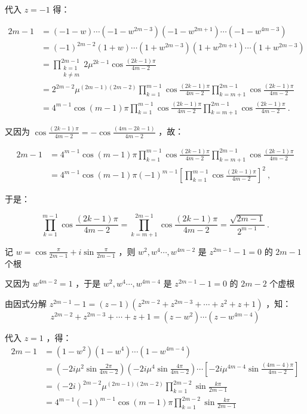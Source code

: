 代入 $z=-1$ 得：

\begin{equation}
\begin{aligned}
2m-1&=(-1-w)\cdots(-1-w^{2m-3})(-1-w^{2m+1})\cdots(-1-w^{4m-3})\\ &=(-1)^{2m-2}(1+w)\cdots(1+w^{2m-3})(1+w^{2m+1})\cdots(1+w^{2m-3})\\ &=\prod_{\substack{k=1\\k\neq m}}^{2m-1}2\mu^{2k-1}\cos\frac{(2k-1)\pi}{4m-2}\\ &=2^{2m-2}\mu^{(2m-1)(2m-2)}\prod_{k=1}^{m-1}\cos{\frac{(2k-1)\pi}{4m-2}}\prod_{k=m+1}^{2m-1}\cos{\frac{(2k-1)\pi}{4m-2}}\\ &=4^{m-1}\cos(m-1)\pi\prod_{k=1}^{m-1}\cos{\frac{(2k-1)\pi}{4m-2}}\prod_{k=m+1}^{2m-1}\cos{\frac{(2k-1)\pi}{4m-2}}~.
\end{aligned}
\end{equation}

又因为 $\displaystyle{\cos\frac{(2k-1)\pi}{4m-2}=-\cos\frac{(4m-2k-1)}{4m-2}}$ ，故：

\begin{equation}
\begin{aligned}
2m-1&=4^{m-1}\cos(m-1)\pi\prod_{k=1}^{m-1}\cos{\frac{(2k-1)\pi}{4m-2}}\prod_{k=m+1}^{2m-1}\cos{\frac{(2k-1)\pi}{4m-2}}\\ &=4^{m-1}\cos(m-1)\pi(-1)^{m-1}\left[\prod_{k=1}^{m-1}\cos{\frac{(2k-1)\pi}{4m-2}}\right]^2~,
\end{aligned}
\end{equation}

于是：

\begin{equation}%
\prod_{k=1}^{m-1}\cos{\frac{(2k-1)\pi}{4m-2}}=\prod_{k=m+1}^{2m-1}\cos{\frac{(2k-1)\pi}{4m-2}}=\frac{\sqrt{2m-1}}{2^{m-1}}~.
\end{equation}

记 $\displaystyle{w=\cos\frac{\pi}{2m-1}+i\sin\frac{\pi}{2m-1}}$ ，则 $w^2,w^4\cdots,w^{4m-2}$ 是 $z^{2m-1}-1=0$ 的 $2m-1$ 个根

又因为 $w^{4m-2}=1$ ，于是 $w^2,w^4\cdots ,w^{4m-4}$ 是 $z^{2m-1}-1=0$ 的 $2m-2$ 个虚根

由因式分解 $\displaystyle{z^{2m-1}-1=(z-1)(z^{2m-2}+z^{2m-3}+\cdots+z^{2}+z+1)}$ ，知：
$$z^{2m-2}+z^{2m-3}+\cdots+z+1=(z-w^2)\cdots(z-w^{4m-4})$$

代入 $z=1$ ，得：
$$\begin{aligned} 2m-1&=(1-w^2)(1-w^4)\cdots(1-w^{4m-4})\\ &=\left(-2i\mu^2\sin\frac{2\pi}{4m-2}\right)\left(-2i\mu^4\sin\frac{4\pi}{4m-2}\right)\cdots\left[-2i\mu^{4m-4}\sin\frac{(4m-4)\pi}{4m-2}\right]\\ &=(-2i)^{2m-2}\mu^{(2m-1)(2m-2)}\prod_{k=1}^{2m-2}\sin\frac{k\pi}{2m-1}\\ &=4^{m-1}(-1)^{m-1}\cos(m-1)\pi\prod_{k=1}^{2m-2}\sin\frac{k\pi}{2m-1} \end{aligned} $$


